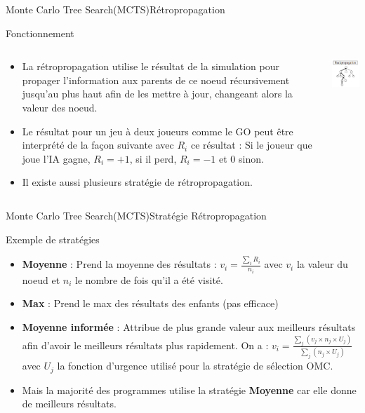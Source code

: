 \begin{frame}{Monte Carlo Tree Search(MCTS)}{Rétropropagation}
	\begin{block}{Fonctionnement}
		\begin{columns}
			\begin{column}{8cm}
				\begin{itemize}
					\item La rétropropagation utilise le résultat de la simulation pour propager l'information aux parents de ce noeud récursivement jusqu'au plus haut afin de les mettre à jour, changeant alors la valeur des noeud. 
					\item Le résultat pour un jeu à deux joueurs comme le GO peut être interprété de la façon suivante avec $R_{i}$ ce résultat : Si le joueur que joue l'IA gagne, $R_{i} = +1$, si il perd, $R_{i} = -1$ et $0$ sinon.
					\item Il existe aussi plusieurs stratégie de rétropropagation.
				\end{itemize}
			\end{column}
			\begin{column}{4cm}
				\includegraphics[width=3cm]{ressources/Backpropagation.png}
			\end{column}
		\end{columns}
	\end{block}
\end{frame}

\begin{frame}{Monte Carlo Tree Search(MCTS)}{Stratégie Rétropropagation}
	\begin{block}{Exemple de stratégies}
		\begin{itemize}
			\item \textbf{Moyenne} : Prend la moyenne des résultats : $v_{i} = \frac{\sum_{i}^{}R_{i}}{n_{i}}$ avec $v_{i}$ la valeur du noeud et $n_i$ le nombre de fois qu'il a été visité.
			\item \textbf{Max} : Prend le max des résultats des enfants (pas efficace)
			\item \textbf{Moyenne informée} : Attribue de plus grande valeur aux meilleurs résultats afin d'avoir le meilleurs résultats plus rapidement.
			On a : $v_{i} = \frac{\sum_{j}^{}(v_{j}\times n_{j}\times U_{j})}{\sum_{j}^{}(n_{j}\times U_{j})}$ avec $U_{j}$ la fonction d'urgence utilisé pour la stratégie de sélection OMC.
			\item Mais la majorité des programmes utilise la stratégie \textbf{Moyenne} car elle donne de meilleurs résultats.
		\end{itemize}
	\end{block}
\end{frame}

